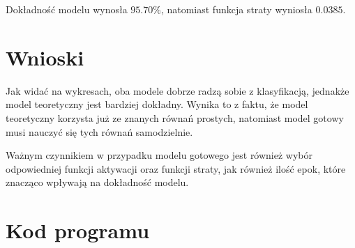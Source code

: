 \documentclass{article}
\begin{document}
Dokładność modelu wynosła $95.70 \% $, natomiast funkcja straty
wyniosła $0.0385$.

\section{Wnioski}

Jak widać na wykresach, oba modele dobrze radzą sobie z klasyfikacją,
jednakże model teoretyczny jest bardziej dokładny. Wynika to z faktu,
że model teoretyczny korzysta już ze znanych równań prostych, natomiast
model gotowy musi nauczyć się tych równań samodzielnie. 

Ważnym czynnikiem w przypadku modelu gotowego jest również wybór odpowiedniej
funkcji aktywacji oraz funkcji straty, jak również ilość epok, które 
znacząco wpływają na dokładność modelu.




\section{Kod programu}

\end{document}
